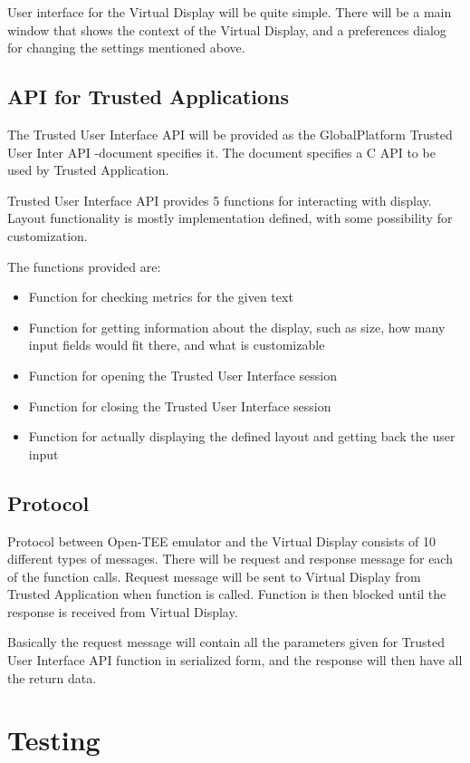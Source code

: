 \documentclass{article}
\begin{document}
User interface for the Virtual Display will be quite simple. There will be a
main window that shows the context of the Virtual Display, and a preferences
dialog for changing the settings mentioned above.

\subsection{API for Trusted Applications}

The Trusted User Interface API will be provided as the GlobalPlatform Trusted
User Inter API -document specifies it. The document specifies a C API to be
used by Trusted Application.

Trusted User Interface API provides 5 functions for interacting with display.
Layout functionality is mostly implementation defined, with some possibility
for customization.

The functions provided are:
\begin{itemize}
    \item{Function for checking metrics for the given text}
    \item{Function for getting information about the display, such as size, how
          many input fields would fit there, and what is customizable}
    \item{Function for opening the Trusted User Interface session}
    \item{Function for closing the Trusted User Interface session}
    \item{Function for actually displaying the defined layout and getting back
          the user input}
\end{itemize}

\subsection{Protocol}

Protocol between Open-TEE emulator and the Virtual Display consists of 10
different types of messages. There will be request and response message for
each of the function calls. Request message will be sent to Virtual Display
from Trusted Application when function is called. Function is then blocked
until the response is received from Virtual Display.

Basically the request message will contain all the parameters given for Trusted
User Interface API function in serialized form, and the response will then have
all the return data.

\section{Testing}
\end{document}
